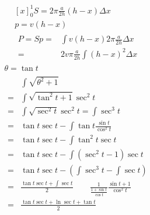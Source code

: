 \documentclass{article}
\begin{document}
  \begin{gather*}
    \left[x\right]^{1}_{0}
    S = 2\pi\frac{a}{2h}(h - x)\Delta{x}\\
    p = v(h - x)\\
    \begin{aligned}
      P = Sp =& \int v(h - x)2\pi\frac{a}{2h}\Delta{x} \\
      =&2v\pi\frac{a}{2h}\int (h - x)^{2} \Delta{x}
    \end{aligned}
  \end{gather*}
  \begin{gather*}
    \theta = \tan{t} \\
    \begin{aligned}
      & \int \sqrt{\theta^{2} + 1} \\
      =& \int \sqrt{\tan^{2}{t} + 1} \sec^{2}{t} \\
      =& \int \sqrt{\sec^{2}{t}} \sec^{2}{t} = \int \sec^{3}{t} \\
      =& \tan{t}\sec{t} - \int \tan{t}\frac{\sin{t}}{\cos^{2}{t}} \\
      =& \tan{t}\sec{t} - \int \tan^{2}{t}\sec{t} \\
      =& \tan{t}\sec{t} - \int (\sec^{2}{t} - 1)\sec{t} \\
      =& \tan{t}\sec{t} - ( \int \sec^{3}{t} - \int \sec{t} ) \\
      =& \frac{\tan{t}\sec{t} + \int \sec{t}}{2} \qquad \frac{1}{\frac{1 + \sin{t}}{\cos{t}}}\frac{\sin{t} + 1}{\cos^{2}{t}} \\
      =& \frac{\tan{t}\sec{t} + \ln{\sec{t} + \tan{t}}}{2}
    \end{aligned}
  \end{gather*}
\end{document}

